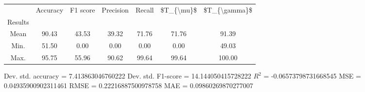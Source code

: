 \begin{tabular}{|c|c|c|c|c|c|c|}
\toprule
{} &  Accuracy &  F1 score &  Precision &  Recall &  \$T\_\{\textbackslash mu\}\$ &  \$T\_\{\textbackslash gamma\}\$ \\
Results &           &           &            &         &            &               \\
\hline
Mean    &     90.43 &     43.53 &      39.32 &   71.76 &      71.76 &         91.39 \\
Min.    &     51.50 &      0.00 &       0.00 &    0.00 &       0.00 &         49.03 \\
Max.    &     95.75 &     55.96 &      90.62 &   99.64 &      99.64 &        100.00 \\
\bottomrule
\end{tabular}

 Dev. std. accuracy = 7.413863046760222
 Dev. std. F1-score = 14.144050415728222
 $R^2$ = -0.06573798731668545
 MSE = 0.04935900902311461
 RMSE = 0.22216887500978758
 MAE = 0.09860269870277007